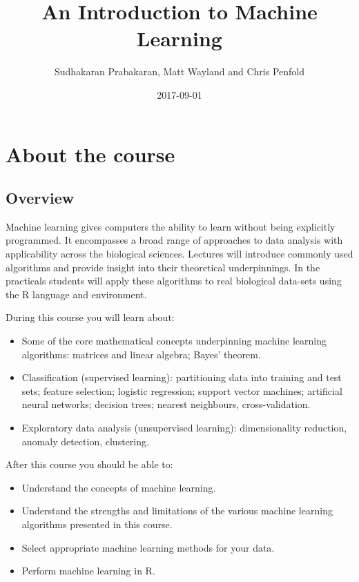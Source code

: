 \documentclass[]{book}
\title{An Introduction to Machine Learning}
\author{Sudhakaran Prabakaran, Matt Wayland and Chris Penfold}
\date{2017-09-01}
\providecommand{\tightlist}{%
  \setlength{\itemsep}{0pt}\setlength{\parskip}{0pt}}
\theoremstyle{definition}
\theoremstyle{definition}
\theoremstyle{definition}
\theoremstyle{remark}
\begin{document}
\maketitle

{
\setcounter{tocdepth}{1}
\tableofcontents
}
\chapter{About the course}\label{about-the-course}

\section{Overview}\label{overview}

Machine learning gives computers the ability to learn without being
explicitly programmed. It encompasses a broad range of approaches to
data analysis with applicability across the biological sciences.
Lectures will introduce commonly used algorithms and provide insight
into their theoretical underpinnings. In the practicals students will
apply these algorithms to real biological data-sets using the R language
and environment.

During this course you will learn about:

\begin{itemize}
\tightlist
\item
  Some of the core mathematical concepts underpinning machine learning
  algorithms: matrices and linear algebra; Bayes' theorem.
\item
  Classification (supervised learning): partitioning data into training
  and test sets; feature selection; logistic regression; support vector
  machines; artificial neural networks; decision trees; nearest
  neighbours, cross-validation.
\item
  Exploratory data analysis (unsupervised learning): dimensionality
  reduction, anomaly detection, clustering.
\end{itemize}

After this course you should be able to:

\begin{itemize}
\tightlist
\item
  Understand the concepts of machine learning.
\item
  Understand the strengths and limitations of the various machine
  learning algorithms presented in this course.
\item
  Select appropriate machine learning methods for your data.
\item
  Perform machine learning in R.
\end{itemize}
\end{document}
